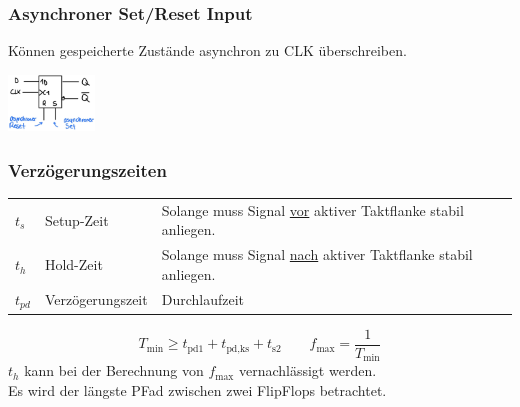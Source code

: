 \subsubsection{Asynchroner Set/Reset Input}
\begin{center}
    \begin{minipage}{0.55\linewidth}
        Können gespeicherte Zustände asynchron zu CLK überschreiben.
    \end{minipage}
    \hfill
    \begin{minipage}{0.4\linewidth}
        \includegraphics[width = 23mm]{images/async_sr.jpeg}
    \end{minipage}
\end{center}

\subsubsection{Verzögerungszeiten}
\begin{flushleft}
    \small
    \begin{tabular}{l l p{32mm}}
        $t_s$ & Setup-Zeit & Solange muss Signal \underline{vor} aktiver Taktflanke stabil anliegen.\\
        $t_h$ & Hold-Zeit & Solange muss Signal \underline{nach} aktiver Taktflanke stabil anliegen.\\
        $t_{pd}$ & Verzögerungszeit & Durchlaufzeit
    \end{tabular}
\end{flushleft}
\begin{equation*}
    T_{\text{min}} \geq t_{\text{pd}1} + t_{\text{pd,ks}} + t_{\text{s}2} \qquad f_{\text{max}} = \frac{1}{T_{\text{min}}}
\end{equation*}
$t_h$ kann bei der Berechnung von $f_{\text{max}}$ vernachlässigt werden.\\
Es wird der längste PFad zwischen zwei FlipFlops betrachtet.

